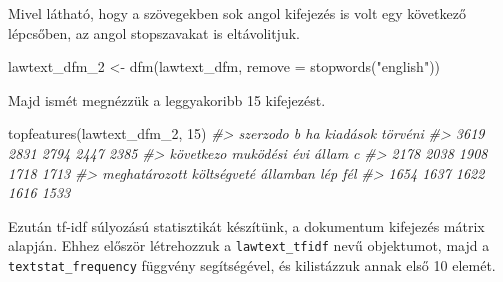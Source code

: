 \documentclass[
]{book}
\newenvironment{Shaded}{\begin{snugshade}}{\end{snugshade}}
\newcommand{\AttributeTok}[1]{\textcolor[rgb]{0.77,0.63,0.00}{#1}}
\newcommand{\CommentTok}[1]{\textcolor[rgb]{0.56,0.35,0.01}{\textit{#1}}}
\newcommand{\DecValTok}[1]{\textcolor[rgb]{0.00,0.00,0.81}{#1}}
\newcommand{\FunctionTok}[1]{\textcolor[rgb]{0.00,0.00,0.00}{#1}}
\newcommand{\NormalTok}[1]{#1}
\newcommand{\OtherTok}[1]{\textcolor[rgb]{0.56,0.35,0.01}{#1}}
\newcommand{\StringTok}[1]{\textcolor[rgb]{0.31,0.60,0.02}{#1}}
\begin{document}
Mivel látható, hogy a szövegekben sok angol kifejezés is volt egy
következő lépcsőben, az angol stopszavakat is eltávolitjuk.

\begin{Shaded}
\begin{Highlighting}[]

\NormalTok{lawtext\_dfm\_2 }\OtherTok{\textless{}{-}} \FunctionTok{dfm}\NormalTok{(lawtext\_dfm, }\AttributeTok{remove =} \FunctionTok{stopwords}\NormalTok{(}\StringTok{"english"}\NormalTok{))}
\end{Highlighting}
\end{Shaded}

Majd ismét megnézzük a leggyakoribb 15 kifejezést.

\begin{Shaded}
\begin{Highlighting}[]

\FunctionTok{topfeatures}\NormalTok{(lawtext\_dfm\_2, }\DecValTok{15}\NormalTok{)}
\CommentTok{\#\textgreater{}      szerzodo             b            ha      kiadások       törvéni }
\CommentTok{\#\textgreater{}          3619          2831          2794          2447          2385 }
\CommentTok{\#\textgreater{}     következo      muködési           évi         állam             c }
\CommentTok{\#\textgreater{}          2178          2038          1908          1718          1713 }
\CommentTok{\#\textgreater{} meghatározott   költségveté      államban           lép           fél }
\CommentTok{\#\textgreater{}          1654          1637          1622          1616          1533}
\end{Highlighting}
\end{Shaded}

Ezután tf-idf súlyozású statisztikát készítünk, a dokumentum kifejezés
mátrix alapján. Ehhez először létrehozzuk a \texttt{lawtext\_tfidf} nevű
objektumot, majd a \texttt{textstat\_frequency} függvény segítségével,
és kilistázzuk annak első 10 elemét.
\end{document}
